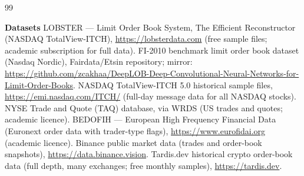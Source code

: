 \documentclass[11pt,a4paper]{article}
\begin{document}
\begin{thebibliography}{99}
\item[] \vspace{2pt}\textbf{Datasets}
 LOBSTER --- Limit Order Book System, The Efficient Reconstructor (NASDAQ TotalView-ITCH),
  \url{https://lobsterdata.com} (free sample files; academic subscription for full data).
 FI-2010 benchmark limit order book dataset (Nasdaq Nordic), Fairdata/Etsin repository;
  mirror: \url{https://github.com/zcakhaa/DeepLOB-Deep-Convolutional-Neural-Networks-for-Limit-Order-Books}.
 NASDAQ TotalView-ITCH 5.0 historical sample files,
  \url{https://emi.nasdaq.com/ITCH/} (full-day message data for all NASDAQ stocks).
 NYSE Trade and Quote (TAQ) database, via WRDS (US trades and quotes; academic licence).
 BEDOFIH --- European High Frequency Financial Data (Euronext order data with trader-type flags),
  \url{https://www.eurofidai.org} (academic licence).
 Binance public market data (trades and order-book snapshots),
  \url{https://data.binance.vision}.
 Tardis.dev historical crypto order-book data (full depth, many exchanges; free monthly samples),
  \url{https://tardis.dev}.
\end{thebibliography}
\end{document}
